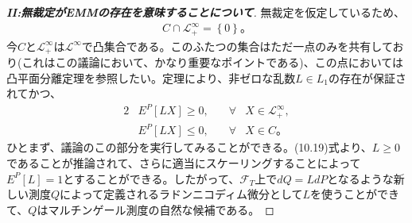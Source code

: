 \documentclass{jsbook}
\theoremstyle{withoutdotendstyle}
\numberwithin{theorem}{chapter}%
\begin{document}
\begin{proof}[{\bf II:無裁定がEMMの存在を意味することについて}]
  無裁定を仮定しているため、
  \begin{align}
    C\cap\mathcal{L}^{\infty}_{+}=\left\{0\right\}\mbox{。}
  \end{align}
  今$C$と$\mathcal{L}^{\infty}_{+}$は$\mathcal{L}^{\infty}$で凸集合である。このふたつの集合はただ一点のみを共有しており(これはこの議論において、かなり重要なポイントである)、この点においては凸平面分離定理を参照したい。定理により、非ゼロな乱数$L\in L_{1}$の存在が保証されてかつ、
  \begin{alignat}{2}
    &E^{P}\left[LX\right]\geq 0, &\quad\forall& X\in\mathcal{L}^{\infty}_{+},\\
    &E^{P}\left[LX\right]\leq 0, &\quad\forall& X\in C\mbox{。}
  \end{alignat}
  ひとまず、議論のこの部分を実行してみることができる。(10.19)式より、$L\geq 0$であることが推論されて、さらに適当にスケーリングすることによって$E^{P}\left[L\right]=1$とすることができる。したがって、$\mathcal{F}_{T}$上で$dQ=LdP$となるような新しい測度$Q$によって定義されるラドンニコディム微分として$L$を使うことができて、$Q$はマルチンゲール測度の自然な候補である。
\end{proof}
\end{document}
